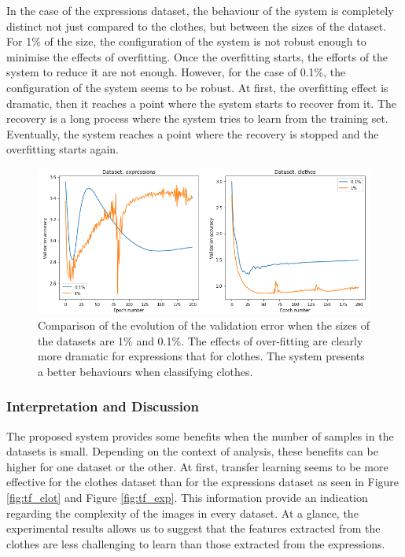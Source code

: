 \documentclass{article}
\begin{document}
In the case of the expressions dataset, the behaviour of the system is completely distinct not just compared to the clothes, but between the sizes of the dataset. For 1\% of the size, the configuration of the system is not robust enough to minimise the effects of overfitting. Once the overfitting starts, the efforts of the system to reduce it are not enough. However, for the case of 0.1\%, the configuration of the system seems to be robust.  At first, the overfitting effect is dramatic, then it reaches a point where the system starts to recover from it. The recovery is a long process where the system tries to learn from the training set. Eventually, the system reaches a point where the recovery is stopped and the overfitting starts again.

\begin{figure}[tb]
    \vskip 5mm
        \begin{center}
            \includegraphics[scale=0.375]{behaviour_rotated.png}
            \caption{Comparison of the evolution of the validation error when the sizes of the datasets are 1\% and 0.1\%. The effects of over-fitting are clearly more dramatic for expressions that for clothes. The system presents a better behaviours when classifying clothes. }
            \label{fig:tf_beh}
        \end{center}
    \vskip -5mm
\end{figure}

	
\subsubsection{\textbf{Interpretation and Discussion}}

The proposed system provides some benefits when the number of samples in the datasets is small. Depending on the context of analysis, these benefits can be higher for one dataset or the other. At first, transfer learning seems to be more effective for the clothes dataset than for the expressions dataset as seen in Figure \ref{fig:tf_clot} and Figure \ref{fig:tf_exp}. This information provide an indication regarding the complexity of the images in every dataset. At a glance, the experimental results allows us to suggest that the features extracted from the clothes are less challenging to learn than those extracted from the expressions.
\end{document}
